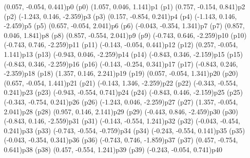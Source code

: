 \psPoint(0.057, -0.054, 0.441){p0}
\psdot[fillcolor=white](p0)
\psPoint(1.057, 0.046, 1.141){p1}
\psdot[fillcolor=gray](p1)
\psPoint(0.757, -0.154, 0.841){p2}
\psdot[fillcolor=gray](p2)
\psPoint(-1.243, 0.146, -2.359){p3}
\psdot[fillcolor=white](p3)
\psPoint(0.157, -0.854, 0.241){p4}
\psdot[fillcolor=gray](p4)
\psPoint(-1.143, 0.146, -2.459){p5}
\psdot[fillcolor=gray](p5)
\psPoint(0.657, -0.054, 2.041){p6}
\psdot[fillcolor=white](p6)
\psPoint(-0.043, -0.354, 1.341){p7}
\psdot[fillcolor=white](p7)
\psPoint(0.857, 0.046, 1.841){p8}
\psdot[fillcolor=white](p8)
\psPoint(0.857, -0.554, 2.041){p9}
\psdot[fillcolor=gray](p9)
\psPoint(-0.743, 0.646, -2.259){p10}
\psdot[fillcolor=white](p10)
\psPoint(-0.743, 0.746, -2.259){p11}
\psdot[fillcolor=white](p11)
\psPoint(-0.143, -0.054, 0.441){p12}
\psdot[fillcolor=white](p12)
\psPoint(0.257, -0.054, 1.141){p13}
\psdot[fillcolor=white](p13)
\psPoint(-0.943, 0.046, -2.259){p14}
\psdot[fillcolor=gray](p14)
\psPoint(-0.843, 0.346, -2.159){p15}
\psdot[fillcolor=white](p15)
\psPoint(-0.843, 0.346, -2.259){p16}
\psdot[fillcolor=gray](p16)
\psPoint(-0.143, -0.254, 0.341){p17}
\psdot[fillcolor=white](p17)
\psPoint(-0.843, 0.246, -2.359){p18}
\psdot[fillcolor=gray](p18)
\psPoint(1.357, 0.146, 2.241){p19}
\psdot[fillcolor=gray](p19)
\psPoint(0.057, -0.054, 1.341){p20}
\psdot[fillcolor=white](p20)
\psPoint(0.657, -0.054, 1.441){p21}
\psdot[fillcolor=white](p21)
\psPoint(-0.143, 1.346, -2.259){p22}
\psdot[fillcolor=white](p22)
\psPoint(-0.343, -0.554, 0.241){p23}
\psdot[fillcolor=gray](p23)
\psPoint(-0.943, -0.554, 0.741){p24}
\psdot[fillcolor=white](p24)
\psPoint(-0.843, 0.446, -2.159){p25}
\psdot[fillcolor=white](p25)
\psPoint(-0.343, -0.754, 0.241){p26}
\psdot[fillcolor=gray](p26)
\psPoint(-1.243, 0.046, -2.259){p27}
\psdot[fillcolor=white](p27)
\psPoint(1.357, -0.054, 2.041){p28}
\psdot[fillcolor=gray](p28)
\psPoint(0.957, 0.146, 2.141){p29}
\psdot[fillcolor=white](p29)
\psPoint(-0.443, 0.846, -2.459){p30}
\psdot[fillcolor=gray](p30)
\psPoint(-0.843, 0.146, -2.559){p31}
\psdot[fillcolor=gray](p31)
\psPoint(-0.143, -0.554, 1.241){p32}
\psdot[fillcolor=white](p32)
\psPoint(-0.043, -0.454, 0.241){p33}
\psdot[fillcolor=gray](p33)
\psPoint(-0.743, -0.554, -0.759){p34}
\psdot[fillcolor=gray](p34)
\psPoint(-0.243, -0.554, 0.141){p35}
\psdot[fillcolor=gray](p35)
\psPoint(-0.043, -0.354, 0.341){p36}
\psdot[fillcolor=gray](p36)
\psPoint(-0.743, 0.746, -1.859){p37}
\psdot[fillcolor=white](p37)
\psPoint(0.457, -0.754, 0.641){p38}
\psdot[fillcolor=gray](p38)
\psPoint(0.457, -0.554, 1.241){p39}
\psdot[fillcolor=gray](p39)
\psPoint(-0.243, -0.054, 0.741){p40}
